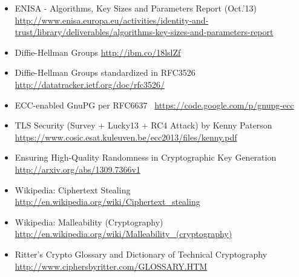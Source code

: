 \begin{itemize}
\item ENISA - Algorithms, Key Sizes and Parameters Report (Oct.'13) \url{http://www.enisa.europa.eu/activities/identity-and-trust/library/deliverables/algorithms-key-sizes-and-parameters-report}
\item Diffie-Hellman Groups \url{http://ibm.co/18lslZf}
\item Diffie-Hellman Groups standardized in RFC3526~\cite{rfc3526} \url{http://datatracker.ietf.org/doc/rfc3526/}
\item ECC-enabled GnuPG per RFC6637~\cite{rfc6637} \url{https://code.google.com/p/gnupg-ecc}
\item TLS Security (Survey + Lucky13 + RC4 Attack) by Kenny Paterson \url{https://www.cosic.esat.kuleuven.be/ecc2013/files/kenny.pdf}
\item Ensuring High-Quality Randomness in Cryptographic Key Generation \url{http://arxiv.org/abs/1309.7366v1}
\item Wikipedia: Ciphertext Stealing \url{http://en.wikipedia.org/wiki/Ciphertext_stealing}
\item Wikipedia: Malleability (Cryptography) \url{http://en.wikipedia.org/wiki/Malleability_(cryptography)}
\item Ritter's Crypto Glossary and Dictionary of Technical Cryptography \url{http://www.ciphersbyritter.com/GLOSSARY.HTM}
\end{itemize}
